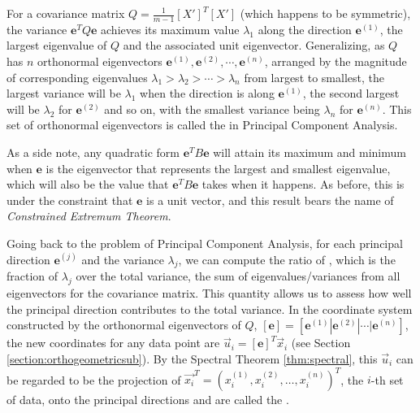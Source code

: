\begin{thm}
\label{thm:PCA}
For a covariance matrix $Q = \frac{1}{m-1}[X']^T[X']$ (which happens to be symmetric), the variance $\textbf{e}^T Q \textbf{e}$ achieves its maximum value $\lambda_1$ along the direction $\textbf{e}^{(1)}$, the largest eigenvalue of $Q$ and the associated unit eigenvector. Generalizing, as $Q$ has $n$ orthonormal eigenvectors $\textbf{e}^{(1)}, \textbf{e}^{(2)}, \cdots, \textbf{e}^{(n)}$, arranged by the magnitude of corresponding eigenvalues $\lambda_1 > \lambda_2 > \cdots > \lambda_n$ from largest to smallest, the largest variance will be $\lambda_1$ when the direction is along $\textbf{e}^{(1)}$, the second largest will be $\lambda_2$ for $\textbf{e}^{(2)}$ and so on, with the smallest variance being $\lambda_n$ for $\textbf{e}^{(n)}$. This set of orthonormal eigenvectors is called the  in Principal Component Analysis.
\end{thm}
As a side note, any quadratic form $\textbf{e}^TB\textbf{e}$ will attain its maximum and minimum when $\textbf{e}$ is the eigenvector that represents the largest and smallest eigenvalue, which will also be the value that $\textbf{e}^TB\textbf{e}$ takes when it happens. As before, this is under the constraint that $\textbf{e}$ is a unit vector, and this result bears the name of \textit{Constrained Extremum Theorem}.\par
Going back to the problem of Principal Component Analysis, for each principal direction $\textbf{e}^{(j)}$ and the variance $\lambda_{j}$, we can compute the ratio of , which is the fraction of  $\lambda_{j}$ over the total variance, the sum of eigenvalues/variances from all eigenvectors for the covariance matrix. This quantity allows us to assess how well the principal direction contributes to the total variance. In the coordinate system constructed by the orthonormal eigenvectors of $Q$, $[\textbf{e}] = [\textbf{e}^{(1)}|\textbf{e}^{(2)}|\cdots|\textbf{e}^{(n)}]$, the new coordinates for any data point are $\vec{u}_i = [\textbf{e}]^T \vec{x}_i$ (see Section \ref{section:orthogeometricsub}). By the Spectral Theorem \ref{thm:spectral}, this $\vec{u}_i$ can be regarded to be the projection of $\vec{x_i}^T = (x_i^{(1)}, x_i^{(2)}, \ldots, x_i^{(n)})^T$, the $i$-th set of data, onto the principal directions and are called the . \par
